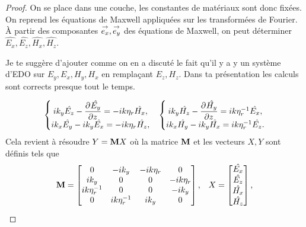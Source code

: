       \begin{proof}
        On se place dans une couche, les constantes de matériaux sont donc fixées.
        On reprend les équations de Maxwell appliquées sur les transformées de Fourier. À partir des composantes \(\vect{e_x},\vect{e_y}\) des équations de Maxwell, on peut déterminer \(\hat{E_x},\hat{E_z},\hat{H_x},\hat{H_z}\).
        \begin{REM}
          Je te suggère d'ajouter comme on en a discuté le fait qu'il y a y un système d'EDO sur \(E_y,E_x,H_y,H_x\) en remplaçant \(E_z,H_z\).
          Dans ta présentation les calculs sont corrects presque tout le temps.
        \end{REM}
        \begin{align*}
            \left\lbrace
            \begin{matrix}
                ik_y \hat{E_z}  - \ddr{z}{\hat{E_y}} = -i k \eta_r  \hat{H_x},
                \\
                ik_x \hat{E_y} - ik_y \hat{E_x} = -i k \eta_r  \hat{H_z},
            \end{matrix}
            \right. 
            &&
            \left\lbrace
            \begin{matrix}
                ik_y \hat{H_z}  - \ddr{z}{\hat{H_y}} = i k \eta_r^{-1} \hat{E_x},
                \\
                ik_x \hat{H_y} - ik_y \hat{H_x} = i k \eta_r^{-1} \hat{E_z}.
            \end{matrix}
            \right.
        \end{align*}
        Cela revient à résoudre \(Y = \mat{M}X\) où la matrice \(\mat{M}\) et les vecteurs \(X, Y\) sont définis tels que
        \begin{align*}
          \mat{M} =
          \begin{bmatrix}
          0 & -ik_y & -ik \eta_r & 0
          \\
          ik_y & 0 & 0 & -ik \eta_r
          \\
          ik \eta_r^{-1} & 0 & 0 & -ik_y
          \\
          0 & ik \eta_r^{-1} & ik_y & 0
          \end{bmatrix},
          &&
          X =
          \begin{bmatrix}
            \hat{E_x}\\
            \hat{E_z}\\
            \hat{H_x}\\
            \hat{H_z}
          \end{bmatrix},

\end{align*}
\end{proof}
